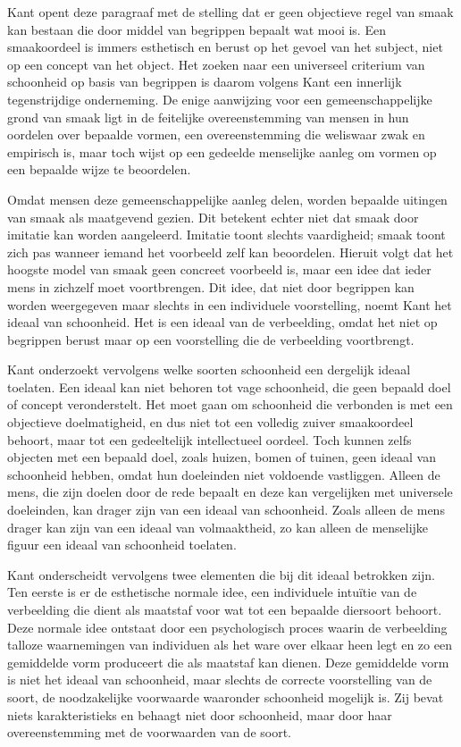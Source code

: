 \begin{mdframed}[leftmargin=0pt,rightmargin=0pt,backgroundcolor=blue!6,linecolor=white,innertopmargin=6pt,innerbottommargin=6pt]

Kant opent deze paragraaf met de stelling dat er geen objectieve regel van smaak kan bestaan die door middel van begrippen bepaalt wat mooi is. Een smaakoordeel is immers esthetisch en berust op het gevoel van het subject, niet op een concept van het object. Het zoeken naar een universeel criterium van schoonheid op basis van begrippen is daarom volgens Kant een innerlijk tegenstrijdige onderneming. De enige aanwijzing voor een gemeenschappelijke grond van smaak ligt in de feitelijke overeenstemming van mensen in hun oordelen over bepaalde vormen, een overeenstemming die weliswaar zwak en empirisch is, maar toch wijst op een gedeelde menselijke aanleg om vormen op een bepaalde wijze te beoordelen.

Omdat mensen deze gemeenschappelijke aanleg delen, worden bepaalde uitingen van smaak als maatgevend gezien.
Dit betekent echter niet dat smaak door imitatie kan worden aangeleerd. Imitatie toont slechts vaardigheid; smaak toont zich pas wanneer iemand het voorbeeld zelf kan beoordelen. 
Hieruit volgt dat het hoogste model van smaak geen concreet voorbeeld is, maar een idee dat ieder mens in zichzelf moet voortbrengen. 
Dit idee, dat niet door begrippen kan worden weergegeven maar slechts in een individuele voorstelling, noemt Kant het ideaal van schoonheid. 
Het is een ideaal van de verbeelding, omdat het niet op begrippen berust maar op een voorstelling die de verbeelding voortbrengt.

Kant onderzoekt vervolgens welke soorten schoonheid een dergelijk ideaal toelaten. Een ideaal kan niet behoren tot vage schoonheid, die geen bepaald doel of concept veronderstelt. Het moet gaan om schoonheid die verbonden is met een objectieve doelmatigheid, en dus niet tot een volledig zuiver smaakoordeel behoort, maar tot een gedeeltelijk intellectueel oordeel. Toch kunnen zelfs objecten met een bepaald doel, zoals huizen, bomen of tuinen, geen ideaal van schoonheid hebben, omdat hun doeleinden niet voldoende vastliggen. Alleen de mens, die zijn doelen door de rede bepaalt en deze kan vergelijken met universele doeleinden, kan drager zijn van een ideaal van schoonheid. Zoals alleen de mens drager kan zijn van een ideaal van volmaaktheid, zo kan alleen de menselijke figuur een ideaal van schoonheid toelaten.

Kant onderscheidt vervolgens twee elementen die bij dit ideaal betrokken zijn. Ten eerste is er de esthetische normale idee, een individuele intuïtie van de verbeelding die dient als maatstaf voor wat tot een bepaalde diersoort behoort. Deze normale idee ontstaat door een psychologisch proces waarin de verbeelding talloze waarnemingen van individuen als het ware over elkaar heen legt en zo een gemiddelde vorm produceert die als maatstaf kan dienen. Deze gemiddelde vorm is niet het ideaal van schoonheid, maar slechts de correcte voorstelling van de soort, de noodzakelijke voorwaarde waaronder schoonheid mogelijk is. Zij bevat niets karakteristieks en behaagt niet door schoonheid, maar door haar overeenstemming met de voorwaarden van de soort.


\end{mdframed}
